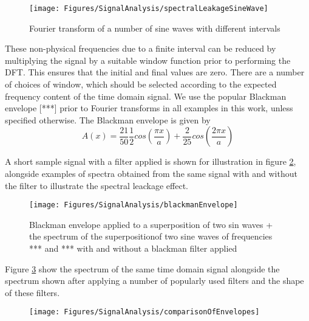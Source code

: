 \begin{figure}
\begin{center}
    \texttt{[image: Figures/SignalAnalysis/spectralLeakageSineWave]}
\end{center}
\caption{Fourier transform of a number of sine waves with different intervals}
\label{fig:signal-analysis-speactral-leakage-sine-wave}
\end{figure}


These non-physical frequencies due to a finite interval can be reduced by multiplying the signal by a suitable window function prior to performing the DFT. This ensures that the initial and final values are zero.
There are a number of choices of window, which should be selected according to the expected frequency content of the time domain signal.  We use the popular Blackman envelope [***] prior to Fourier transforms in all examples in this work, unless specified otherwise. The Blackman envelope is given by
$$
A(x) = \frac{21}{50} \frac{1}{2} cos ( \frac{\pi x}{a} ) + \frac{2}{25} cos ( \frac{2 \pi x }{a} ) 
$$

A short sample signal with a filter applied is shown for illustration in figure \ref{fig:signal-analysis-blackman-envelope}, alongside examples of spectra obtained from the same signal with and without the filter to illustrate the spectral leackage effect.

\begin{figure}
\begin{center}
    \texttt{[image: Figures/SignalAnalysis/blackmanEnvelope]}
\end{center}
\caption{Blackman envelope applied to a superposition of two sin waves + the spectrum of the superpositionof two sine waves of frequencies *** and *** with and without a blackman filter applied }
\label{fig:signal-analysis-blackman-envelope}
\end{figure}

Figure \ref{fig:signal-analysis-comparison-of-envelopes} show the spectrum of the same time domain signal alongside the spectrum shown after applying a number of popularly used filters and the shape of these filters.

\begin{figure}
\begin{center}
    \texttt{[image: Figures/SignalAnalysis/comparisonOfEnvelopes]}
\end{center}
\caption{}
\label{fig:signal-analysis-comparison-of-envelopes}
\end{figure}

